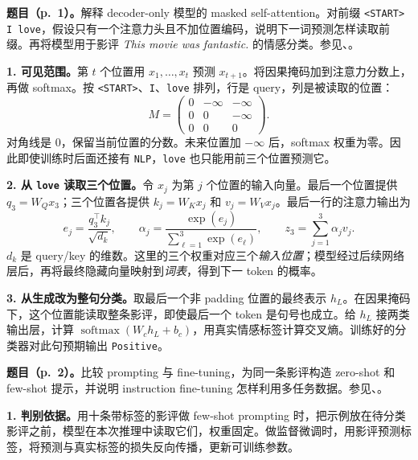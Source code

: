 \nopagebreak[4]
\textbf{题目（p.~1）。}解释 decoder-only 模型的 masked self-attention。对前缀 \texttt{<START> I love}，假设只有一个注意力头且不加位置编码，说明下一词预测怎样读取前缀。再将模型用于影评 \textit{This movie was fantastic.} 的情感分类。参见、。

\textbf{1. 可见范围。}第 $t$ 个位置用 $x_1,\ldots,x_t$ 预测 $x_{t+1}$。将因果掩码加到注意力分数上，再做 softmax。按 \texttt{<START>}、\texttt{I}、\texttt{love} 排列，行是 query，列是被读取的位置：
\[
  M=\begin{pmatrix}
  0&-\infty&-\infty\\
  0&0&-\infty\\
  0&0&0
  \end{pmatrix}.
\]
对角线是 $0$，保留当前位置的分数。未来位置加 $-\infty$ 后，softmax 权重为零。因此即使训练时后面还接有 \texttt{NLP}，\texttt{love} 也只能用前三个位置预测它。

\textbf{2. 从 \texttt{love} 读取三个位置。}令 $x_j$ 为第 $j$ 个位置的输入向量。最后一个位置提供 $q_3=W_Qx_3$；三个位置各提供 $k_j=W_Kx_j$ 和 $v_j=W_Vx_j$。最后一行的注意力输出为
\[
 e_j=\frac{q_3^\top k_j}{\sqrt{d_k}},\qquad
 \alpha_j=\frac{\exp(e_j)}{\sum_{\ell=1}^{3}\exp(e_\ell)},\qquad
 z_3=\sum_{j=1}^{3}\alpha_jv_j .
\]
$d_k$ 是 query/key 的维数。这里的三个权重对应三个\emph{输入位置}；模型经过后续网络层后，再将最终隐藏向量映射到\emph{词表}，得到下一 token 的概率。

\textbf{3. 从生成改为整句分类。}取最后一个非 padding 位置的最终表示 $h_L$。在因果掩码下，这个位置能读取整条影评，即使最后一个 token 是句号也成立。给 $h_L$ 接两类输出层，计算 $\operatorname{softmax}(W_ch_L+b_c)$，用真实情感标签计算交叉熵。训练好的分类器对此句预期输出 \texttt{Positive}。

\nopagebreak[4]
\textbf{题目（p.~2）。}比较 prompting 与 fine-tuning，为同一条影评构造 zero-shot 和 few-shot 提示，并说明 instruction fine-tuning 怎样利用多任务数据。参见、。

\textbf{1. 判别依据。}用十条带标签的影评做 few-shot prompting 时，把示例放在待分类影评之前，模型在本次推理中读取它们，权重固定。做监督微调时，用影评预测标签，将预测与真实标签的损失反向传播，更新可训练参数。


